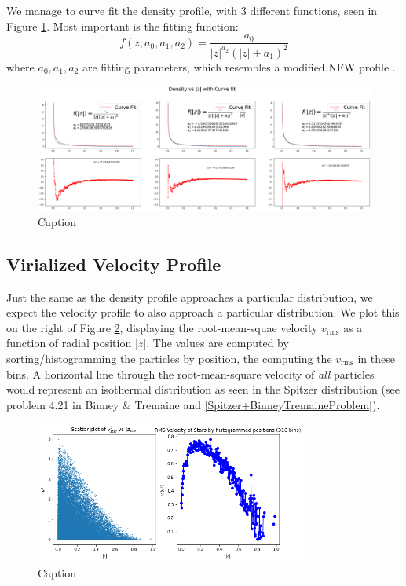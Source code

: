 \documentclass[oneside]{book}
\begin{document}
We manage to curve fit the density profile, with 3 different functions, seen in Figure \ref{Density Curve Fit}.
Most important is the fitting function:
\begin{equation}
    f(z; a_0,a_1,a_2) = \frac{a_0}{|z|^{a_2} (|z|+a_1)^2}
    \label{Fit function}
\end{equation}
where $a_0,a_1,a_2$ are fitting parameters, which resembles a modified NFW profile \cite{NFW1996}.

\begin{figure}[h]
    \centering
    \includegraphics[width = \textwidth]{Images/DensityCurveFit.png}
    \caption{Caption}
    \label{Density Curve Fit}
\end{figure}

\subsection{Virialized Velocity Profile}
Just the same as the density profile approaches a particular distribution, we expect the velocity profile to also approach a particular distribution.
We plot this on the right of Figure \ref{Velocity Profile}, displaying the root-mean-squae velocity $v_\text{rms}$ as a function of radial position $|z|$.
The values are computed by sorting/histogramming the particles by position, the computing the $v_\text{rms}$ in these bins.
A horizontal line through the root-mean-square velocity of \textit{all} particles would represent an isothermal distribution as seen in 
the Spitzer distribution (see problem 4.21 in Binney \& Tremaine \cite{Binney&Tremaine} and \cref{Spitzer+BinneyTremaineProblem}).
\begin{figure}[h]
    \centering
    \includegraphics[width = 0.8\textwidth]{Images/VelocityDistribution.png}
    \caption{Caption}
    \label{Velocity Profile}
\end{figure}
\end{document}
